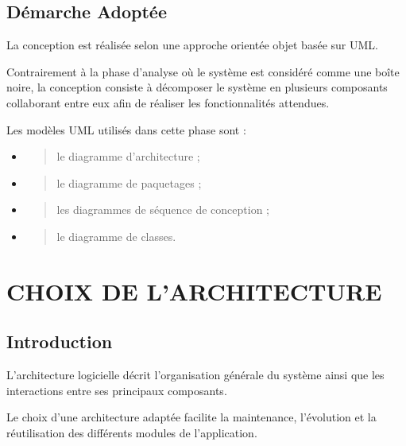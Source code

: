\hypertarget{duxe9marche-adoptuxe9e}{%
\section{Démarche Adoptée}\label{duxe9marche-adoptuxe9e}}

La conception est réalisée selon une approche orientée objet basée sur
UML.

Contrairement à la phase d'analyse où le système est considéré comme une
boîte noire, la conception consiste à décomposer le système en plusieurs
composants collaborant entre eux afin de réaliser les fonctionnalités
attendues.

Les modèles UML utilisés dans cette phase sont :

\begin{itemize}
\item
  \begin{quote}
  le diagramme d'architecture ;
  \end{quote}
\item
  \begin{quote}
  le diagramme de paquetages ;
  \end{quote}
\item
  \begin{quote}
  les diagrammes de séquence de conception ;
  \end{quote}
\item
  \begin{quote}
  le diagramme de classes.
  \end{quote}
\end{itemize}

\hypertarget{chapitre-2-choix-de-larchitecture}{%
\chapter{CHOIX DE L'ARCHITECTURE}\label{chapitre-2-choix-de-larchitecture}}

\hypertarget{introduction}{%
\section{Introduction}\label{introduction}}

L'architecture logicielle décrit l'organisation générale du système
ainsi que les interactions entre ses principaux composants.

Le choix d'une architecture adaptée facilite la maintenance, l'évolution
et la réutilisation des différents modules de l'application.

